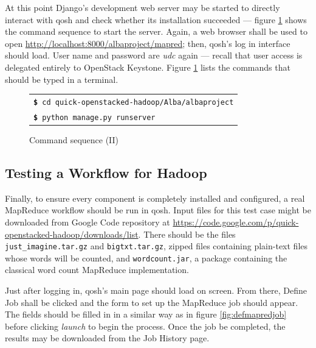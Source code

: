 At this point Django's development web server may be started to directly interact with qosh and check whether its installation succeeded --- figure \ref{fig:comandosshell2} shows the command sequence to start the server. Again, a web browser shall be used to open \url{http://localhost:8000/albaproject/mapred}; then, qosh's log in interface should load. User name and password are \emph{udc} again --- recall that user access is delegated entirely to OpenStack Keystone. Figure \ref{fig:comandosshell2} lists the commands that should be typed in a terminal.

\begin{figure}[tbp]
    \begin{center}
        \begin{tabular}{|l|}
            \hline
            \texttt{{\bf \$} cd quick-openstacked-hadoop/Alba/albaproject} \\
            \texttt{{\bf \$} python manage.py runserver} \\
            \hline
        \end{tabular}
        \caption{Command sequence (II)}
        \label{fig:comandosshell2}
    \end{center}
\end{figure}

\subsection{Testing a Workflow for Hadoop}\label{subsec:flujohadoop}
\noindent Finally, to ensure every component is completely installed and configured, a real MapReduce workflow should be run in qosh. Input files for this test case might be downloaded from Google Code repository at \url{https://code.google.com/p/quick-openstacked-hadoop/downloads/list}. There should be the files \texttt{just\_imagine.tar.gz} and \texttt{bigtxt.tar.gz}, zipped files containing plain-text files whose words will be counted, and \texttt{wordcount.jar}, a package containing the classical word count MapReduce implementation.

Just after logging in, qosh's main page should load on screen. From there, Define Job shall be clicked and the form to set up the MapReduce job should appear. The fields should be filled in in a similar way as in figure \ref{fig:defmapredjob} before clicking \emph{launch} to begin the process. Once the job be completed, the results may be downloaded from the Job History page.


